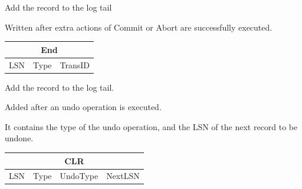 \documentclass{beamer}
\begin{document}
\begin{slide}{
	\item Add the record to the log tail
	\item Written after extra actions of Commit or Abort are successfully executed.
	\begin{table}
		\begin{tabular}{|c|c|c|}
			\hline
			\multicolumn{3}{|c|}{\textbf{End}} \\
			\hline
			LSN & Type & TransID \\
			\hline
		\end{tabular}
	\end{table}
}\end{slide}

\begin{slide}{
	\item Add the record to the log tail.
	\item Added after an undo operation is executed.
	\item It contains the type of the undo operation, and the LSN of the next record to be undone.
	\begin{table}
		\begin{tabular}{|c|c|c|c|}
			\hline
			\multicolumn{4}{|c|}{\textbf{CLR}} \\
			\hline
			LSN & Type & UndoType & NextLSN \\
			\hline
		\end{tabular}
	\end{table}
}\end{slide}
\end{document}
